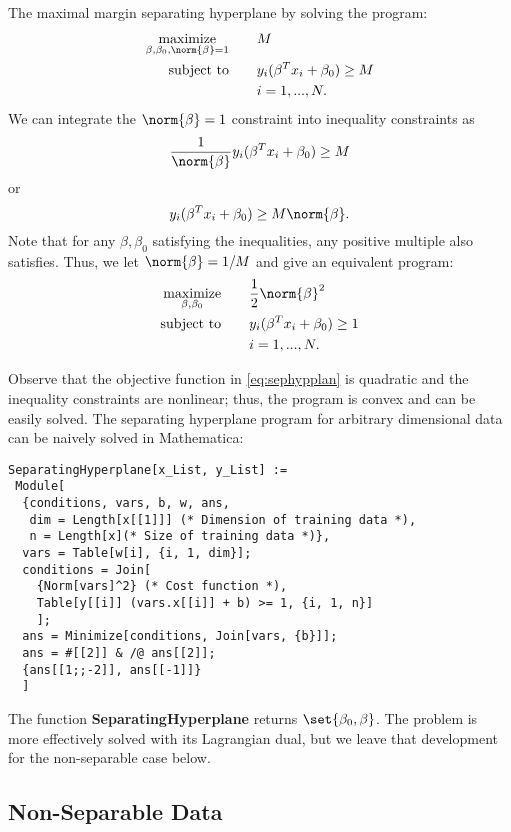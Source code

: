\documentclass[10pt]{article}
\begin{document}
The maximal margin separating hyperplane by solving the program:
\begin{align*}
	\operatorname*{maximize}_{\beta,\beta_{0}, \norm{\beta}=1}\qquad & M \\
	\text{subject to}\qquad & y_{i} (\beta^{T}x_{i}+\beta_{0})\geq M \\
	&i=1,...,N.
\end{align*}
We can integrate the $\norm{\beta}=1$ constraint into inequality constraints as
\[
	\frac{1}{\norm{\beta}}y_{i} (\beta^{T}x_{i}+\beta_{0})\geq M
\]
or
\[
	y_{i} (\beta^{T}x_{i}+\beta_{0})\geq M \norm{\beta}.
\]
Note that for any $\beta, \beta_{0}$ satisfying the inequalities, any positive multiple also satisfies. Thus, we let $\norm{\beta}=1/M$ and give an equivalent program:
\begin{align}
	\label{eq:sephypplan}\operatorname*{maximize}_{\beta,\beta_{0}}\qquad & \frac{1}{2}\norm{\beta}^{2} \\
	\text{subject to}\qquad & y_{i} (\beta^{T}x_{i}+\beta_{0})\geq 1 \nonumber\\
	&i=1,...,N.\nonumber
\end{align}

Observe that the objective function in \eqref{eq:sephypplan} is quadratic and the inequality constraints are nonlinear; thus, the program is convex and can be easily solved. The separating hyperplane program for arbitrary dimensional data can be naively solved in Mathematica:

\begin{lstlisting}
SeparatingHyperplane[x_List, y_List] :=
 Module[
  {conditions, vars, b, w, ans,
   dim = Length[x[[1]]] (* Dimension of training data *),
   n = Length[x](* Size of training data *)},
  vars = Table[w[i], {i, 1, dim}];
  conditions = Join[
    {Norm[vars]^2} (* Cost function *),
    Table[y[[i]] (vars.x[[i]] + b) >= 1, {i, 1, n}]
    ];
  ans = Minimize[conditions, Join[vars, {b}]];
  ans = #[[2]] & /@ ans[[2]];
  {ans[[1;;-2]], ans[[-1]]}
  ]
\end{lstlisting}

The function \textbf{SeparatingHyperplane} returns $\set{\beta_{0}, \beta}$. The problem is more effectively solved with its Lagrangian dual, but we leave that development for the non-separable case below.

\subsection{Non-Separable Data} %
\label{sub:non_separable_data}
\end{document}
